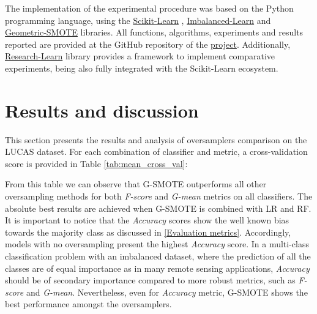 \documentclass[remotesensing,article,submit,moreauthors,pdftex]{Definitions/mdpi}
\begin{document}
The implementation of the experimental procedure was based on the Python
programming language, using the
\href{https://scikit-learn.org/stable/}{Scikit-Learn} \cite{Pedregosa2011},
\href{https://imbalanced-learn.org/en/stable/}{Imbalanced-Learn} \cite{JMLR:v18:16-365}
and
\href{https://geometric-smote.readthedocs.io/en/latest/?badge=latest}{Geometric-SMOTE}
libraries. All functions, algorithms, experiments and results reported are
provided at the GitHub repository of the
\href{https://github.com/AlgoWit/publications/tree/master/remote-sensing-lucas}{project}.
Additionally,
\href{https://research-learn.readthedocs.io/en/latest/?badge=latest}{Research-Learn}
library provides a framework to implement comparative experiments, being also
fully integrated with the Scikit-Learn ecosystem.

\section{Results and discussion}

This section presents the results and analysis of oversamplers comparison on the
LUCAS dataset. For each combination of classifier and metric, a cross-validation
score is provided in Table \ref{tab:mean_cross_val}:


From this table we can observe that G-SMOTE outperforms all other oversampling
methods for both \textit{F-score} and \textit{G-mean} metrics on all
classifiers. The absolute best results are achieved when G-SMOTE is combined
with LR and RF. It is important to notice that the \textit{Accuracy} scores show the well
known bias towards the majority class as discussed in \ref{Evaluation metrics}.
Accordingly, models with no oversampling present the highest \textit{Accuracy} score. In
a multi-class classification problem with an imbalanced dataset, where the
prediction of all the classes are of equal importance as in many remote sensing
applications, \textit{Accuracy} should be of secondary importance compared to more robust
metrics, such as \textit{F-score} and \textit{G-mean}. Nevertheless, even for
\textit{Accuracy} metric, G-SMOTE shows the best performance amongst the oversamplers.
\end{document}

